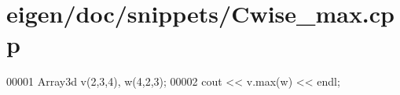 \hypertarget{eigen_2doc_2snippets_2_cwise__max_8cpp_source}{}\section{eigen/doc/snippets/\+Cwise\+\_\+max.cpp}
\label{eigen_2doc_2snippets_2_cwise__max_8cpp_source}

\begin{DoxyCode}
00001 Array3d v(2,3,4), w(4,2,3);
00002 cout << v.max(w) << endl;
\end{DoxyCode}
